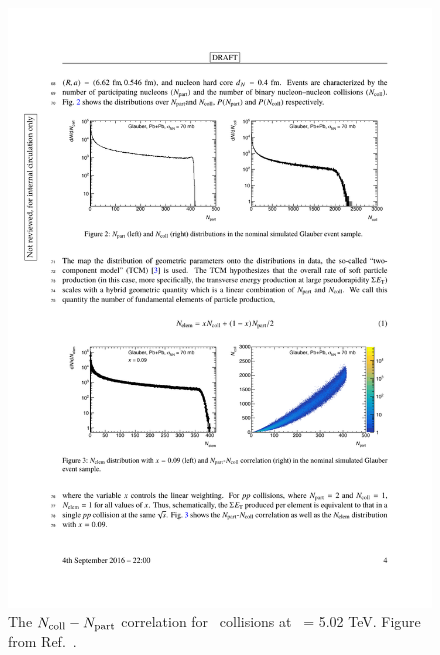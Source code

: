 \begin{figure}
\begin{center}
  \begin{minipage}[b]{0.4\textwidth}
\includegraphics[width=\textwidth]{figures/theory/NcollNpart}
\caption{The $\mbox{$N_{\mathrm{coll}}$}-\mbox{$N_{\mathrm{part}}$}$ correlation for \pbpb\ collisions at \sqrtsnn\ = 5.02 TeV.
Figure from Ref.~\cite{Perepelitsa:2212936}.}
\label{fig:NcollNpart}
  \end{minipage}
 \qquad  \qquad  \qquad
  \begin{minipage}[b]{0.4\textwidth}

\end{minipage}
\end{center}
\end{figure}

